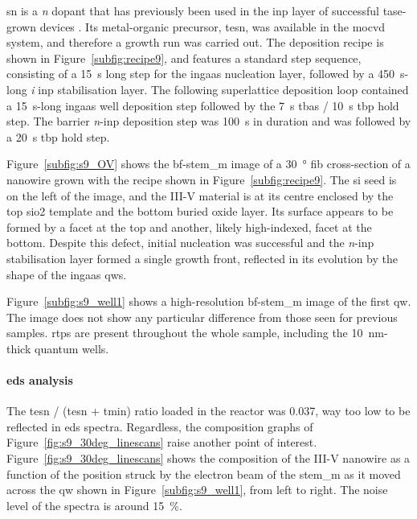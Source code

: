 \Acl{sn} is a \textit{n} dopant \cite{Vedel2023} that has previously been used in the \acs{inp} layer of successful \acs{tase}-grown devices \cite{Wen2022}. Its metal-organic precursor, \acf{tesn}, was available in the \acs{mocvd} system, and therefore a growth run was carried out. The deposition recipe is shown in Figure~\ref{subfig:recipe9}, and features a standard step sequence, consisting of a \qty{15}{\second} long step for the \acs{ingaas} nucleation layer, followed by a \qty{450}{\second}-long \textit{i} \acs{inp} stabilisation layer. The following superlattice deposition loop contained a \qty{15}{\second}-long \acs{ingaas} well deposition step followed by the \qty{7}{\second} \acs{tbas} / \qty{10}{\second} \acs{tbp} hold step. The barrier \textit{n}-\acs{inp} deposition step was \qty{100}{\second} in duration and was followed by a \qty{20}{\second} \acs{tbp} hold step.

Figure~\ref{subfig:s9_OV} shows the \acs{bf}-\acs{stem_m} image of a \qty{30}{\degree} \acs{fib} cross-section of a nanowire grown with the recipe shown in Figure~\ref{subfig:recipe9}. The \acl{si} seed is on the left of the image, and the III-V material is at its centre enclosed by the top \acs{sio2} template and the bottom buried oxide layer. Its surface appears to be formed by a  facet at the top and another, likely high-indexed, facet at the bottom. Despite this defect, initial nucleation was successful and the \textit{n}-\acs{inp} stabilisation layer formed a single  growth front, reflected in its evolution by the shape of the \acs{ingaas} \acl{qw}s.

Figure~\ref{subfig:s9_well1} shows a high-resolution \acs{bf}-\acs{stem_m} image of the first \acl{qw}. The image does not show any particular difference from those seen for previous samples. \Acl{rtp}s are present throughout the whole sample, including the \qty{10}{\nano\metre}-thick quantum wells.

\paragraph{\acs{eds} analysis} The \acs{tesn} / (\acs{tesn} + \acs{tmin}) ratio loaded in the reactor was \num{0.037}, way too low to be reflected in \acs{eds} spectra. Regardless, the composition graphs of Figure~\ref{fig:s9_30deg_linescans} raise another point of interest. Figure~\ref{fig:s9_30deg_linescans} shows the composition of the III-V nanowire as a function of the position struck by the electron beam of the \acs{stem_m} as it moved across the \acl{qw} shown in Figure~\ref{subfig:s9_well1}, from left to right. The noise level of the spectra is around \qty{15}{\%}.

